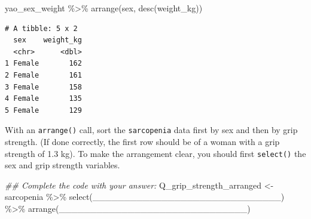 \documentclass[
  letterpaper,
  DIV=11,
  numbers=noendperiod]{scrreprt}
\newenvironment{Shaded}{\begin{snugshade}}{\end{snugshade}}
\newcommand{\DocumentationTok}[1]{\textcolor[rgb]{0.37,0.37,0.37}{\textit{#1}}}
\newcommand{\FunctionTok}[1]{\textcolor[rgb]{0.28,0.35,0.67}{#1}}
\newcommand{\NormalTok}[1]{\textcolor[rgb]{0.00,0.23,0.31}{#1}}
\newcommand{\OtherTok}[1]{\textcolor[rgb]{0.00,0.23,0.31}{#1}}
\newcommand{\SpecialCharTok}[1]{\textcolor[rgb]{0.37,0.37,0.37}{#1}}
\begin{document}
\begin{Shaded}
\begin{Highlighting}[]
\NormalTok{yao\_sex\_weight }\SpecialCharTok{\%\textgreater{}\%} 
  \FunctionTok{arrange}\NormalTok{(sex, }\FunctionTok{desc}\NormalTok{(weight\_kg))}
\end{Highlighting}
\end{Shaded}

\begin{verbatim}
# A tibble: 5 x 2
  sex    weight_kg
  <chr>      <dbl>
1 Female       162
2 Female       161
3 Female       158
4 Female       135
5 Female       129
\end{verbatim}

\begin{tcolorbox}[enhanced jigsaw, titlerule=0mm, colback=white, left=2mm, breakable, opacitybacktitle=0.6, colbacktitle=quarto-callout-tip-color!10!white, colframe=quarto-callout-tip-color-frame, bottomtitle=1mm, opacityback=0, coltitle=black, arc=.35mm, toptitle=1mm, title=\textcolor{quarto-callout-tip-color}{\faLightbulb}\hspace{0.5em}{Practice}, leftrule=.75mm, toprule=.15mm, bottomrule=.15mm, rightrule=.15mm]

With an \texttt{arrange()} call, sort the \texttt{sarcopenia} data first
by sex and then by grip strength. (If done correctly, the first row
should be of a woman with a grip strength of 1.3 kg). To make the
arrangement clear, you should first \texttt{select()} the sex and grip
strength variables.

\begin{Shaded}
\begin{Highlighting}[]
\DocumentationTok{\#\# Complete the code with your answer:}
\NormalTok{Q\_grip\_strength\_arranged }\OtherTok{\textless{}{-}} 
\NormalTok{  sarcopenia }\SpecialCharTok{\%\textgreater{}\%} 
  \FunctionTok{select}\NormalTok{(\_\_\_\_\_\_\_\_\_\_\_\_\_\_\_\_\_\_\_\_\_\_\_\_\_\_\_\_\_\_) }\SpecialCharTok{\%\textgreater{}\%} 
  \FunctionTok{arrange}\NormalTok{(\_\_\_\_\_\_\_\_\_\_\_\_\_\_\_\_\_\_\_\_\_\_\_\_\_\_\_\_\_\_)}
\end{Highlighting}
\end{Shaded}

\end{tcolorbox}
\end{document}
